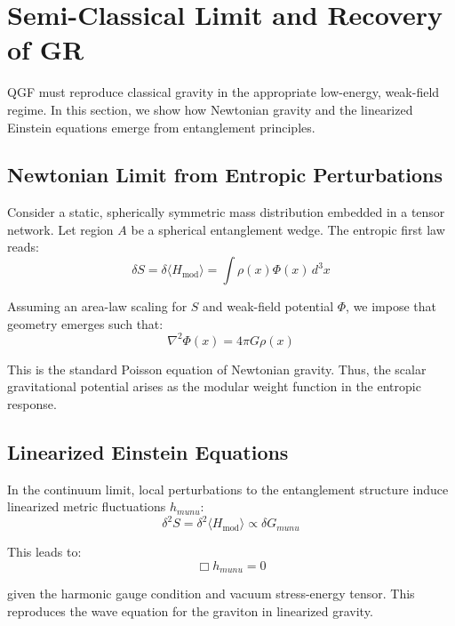 \documentclass[11pt]{article}
\def\mu{mu}
\def\nu{nu}
\begin{document}
\section{Semi-Classical Limit and Recovery of GR}

QGF must reproduce classical gravity in the appropriate low-energy, weak-field regime. In this section, we show how Newtonian gravity and the linearized Einstein equations emerge from entanglement principles.

\subsection{Newtonian Limit from Entropic Perturbations}

Consider a static, spherically symmetric mass distribution embedded in a tensor network. Let region \( A \) be a spherical entanglement wedge. The entropic first law reads:
\begin{equation}
\delta S = \delta \langle H_{\text{mod}} \rangle = \int \rho(x) \Phi(x) \, d^3x
\end{equation}

Assuming an area-law scaling for \( S \) and weak-field potential \( \Phi \), we impose that geometry emerges such that:
\begin{equation}
\nabla^2 \Phi(x) = 4\pi G \rho(x)
\end{equation}

This is the standard Poisson equation of Newtonian gravity. Thus, the scalar gravitational potential arises as the modular weight function in the entropic response.

\subsection{Linearized Einstein Equations}

In the continuum limit, local perturbations to the entanglement structure induce linearized metric fluctuations \( h_{\mu\nu} \):
\begin{equation}
\delta^2 S = \delta^2 \langle H_{\text{mod}} \rangle \propto \delta G_{\mu\nu}
\end{equation}

This leads to:
\begin{equation}
\Box h_{\mu\nu} = 0
\end{equation}

given the harmonic gauge condition and vacuum stress-energy tensor. This reproduces the wave equation for the graviton in linearized gravity.
\end{document}
